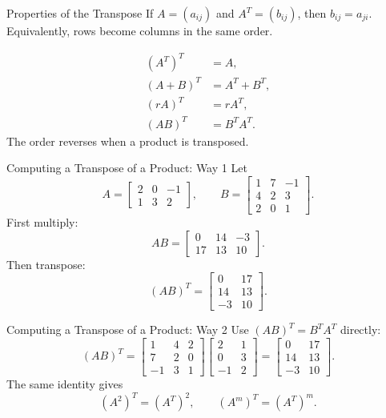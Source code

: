 \begin{frame}[shrink=5]{Properties of the Transpose}
If $A=(a_{ij})$ and $A^T=(b_{ij})$, then $b_{ij}=a_{ji}$. Equivalently, rows become columns in the same order.
\medskip

\begin{align*}
(A^T)^T&=A,\\
(A+B)^T&=A^T+B^T,\\
(rA)^T&=rA^T,\\
(AB)^T&=B^TA^T.
\end{align*}
The order reverses when a product is transposed.
\end{frame}

\begin{frame}{Computing a Transpose of a Product: Way 1}
Let
\[
A=\begin{bmatrix}2&0&-1\\1&3&2\end{bmatrix},\qquad
B=\begin{bmatrix}1&7&-1\\4&2&3\\2&0&1\end{bmatrix}.
\]
First multiply:
\[
AB=\begin{bmatrix}0&14&-3\\17&13&10\end{bmatrix}.
\]
Then transpose:
\[
(AB)^T=\begin{bmatrix}0&17\\14&13\\-3&10\end{bmatrix}.
\]
\end{frame}

\begin{frame}{Computing a Transpose of a Product: Way 2}
Use $(AB)^T=B^TA^T$ directly:
\[
(AB)^T=
\begin{bmatrix}1&4&2\\7&2&0\\-1&3&1\end{bmatrix}
\begin{bmatrix}2&1\\0&3\\-1&2\end{bmatrix}
=\begin{bmatrix}0&17\\14&13\\-3&10\end{bmatrix}.
\]
The same identity gives
\[
(A^2)^T=(A^T)^2,\qquad (A^m)^T=(A^T)^m.
\]
\end{frame}

